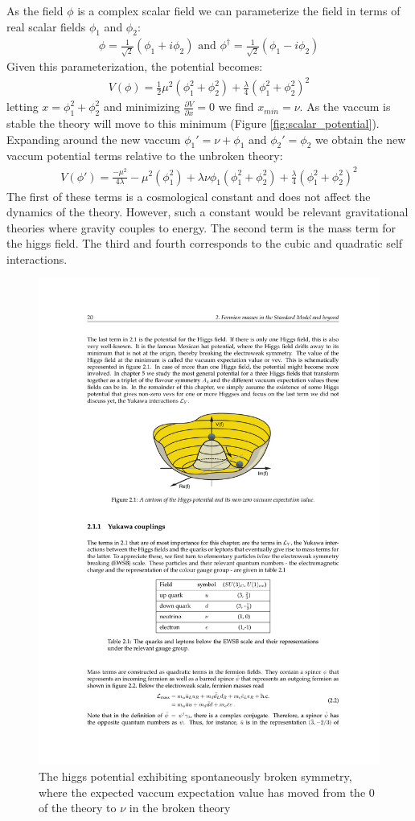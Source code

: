 As the field $\phi$ is a complex scalar field we can parameterize the field in terms
 of real scalar fields $\phi_1$ and $\phi_2$:
\begin{align*}
\phi = \frac{1}{\sqrt{2}} ( \phi_1 + i \phi_2) \text{ and } \phi^\dagger = \frac{1}{\sqrt{2}} ( \phi_1 - i \phi_2)
\end{align*}
Given this parameterization, the potential becomes:
\begin{align*}
V(\phi) = \frac{1}{2}\mu^2 ( \phi_1^2 + \phi_2^2 ) + \frac{\lambda}{4} ( \phi_1^2 + \phi_2^2)^2 
\end{align*}
letting $x = \phi_1^2 + \phi_2^2$ and minimizing $\frac{\partial V}{\partial x } = 0$ we find $x_{min} = \nu$. As
the vaccum is stable the theory will move to this minimum (Figure \ref{fig:scalar_potential}). Expanding
around the new vaccum $\phi_1' = \nu + \phi_1$ and $\phi_2' = \phi_2$ we obtain the new vaccum potential terms
relative to the unbroken theory:
\begin{align*}
V(\phi') = \frac{-\mu^2}{4\lambda} - \mu^2 (\phi_1^2) + \lambda \nu \phi_1 (\phi_1^2 +\phi_2^2) + \frac{\lambda}{4}(\phi_1^2 + \phi_2^2)^2 
\end{align*}
The first of these terms is a cosmological constant and does not affect the dynamics of the theory. However,
such a constant would be relevant gravitational theories where gravity couples to energy.
The second term is the mass term for the higgs field. The third and fourth corresponds to the cubic
 and quadratic self interactions. 

\begin{figure}
\begin{center}
\includegraphics[width=.55\textwidth]{pics/higgs_potential}
\end{center}
\caption{The higgs potential exhibiting spontaneously broken symmetry, where the expected vaccum expectation
value has moved from the $0$ of the theory to $\nu$ in the broken theory}
\end{figure}

